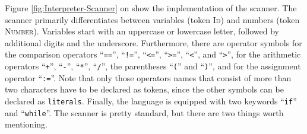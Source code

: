 Figure \ref{fig:Interpreter-Scanner} on \pageref{fig:Interpreter-Scanner} show the implementation of the
scanner. The scanner primarily differentiates between variables (token \textsc{Id}) and numbers (token
\textsc{Number}).  Variables start with an uppercase or lowercase letter, followed by additional digits and 
the underscore. Furthermore, there are operator symbols for the comparison operators
``\texttt{==}'', ``\texttt{!=}'', ``\texttt{<=}'', ``\texttt{>=}'', ``\texttt{<}'', and ``\texttt{>}'',
for the arithmetic operators ``\texttt{+}'',  ``\texttt{-}'',  ``\texttt{*}'',  ``\texttt{/}'', the parentheses
``\texttt{(}'' and ``\texttt{)}'',  and for the assignment operator ``\texttt{:=}''.  Note that only those operators names 
that consist of more than two characters have to be declared as tokens, since the other symbols can be declared
as \texttt{literals}.  Finally, the language is equipped with two keywords ``\texttt{if}'' and ``\texttt{while}''.
The scanner is pretty standard, but there are two things worth mentioning.
